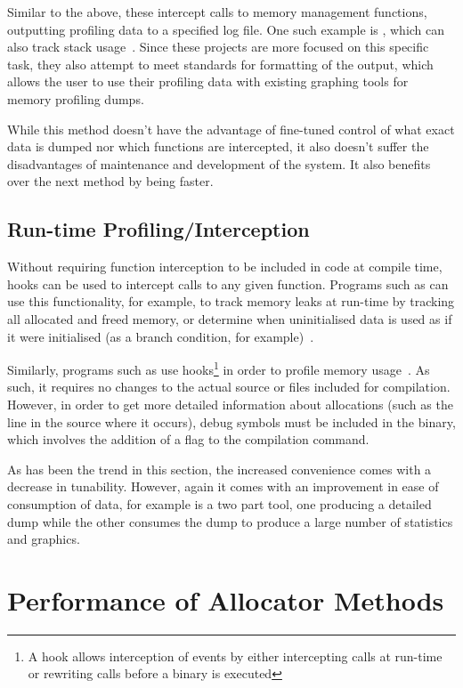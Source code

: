 Similar to the above, these intercept calls to memory management functions, outputting profiling data to a specified log file. One such example is , which can also track stack usage~\cite{malloccount}. Since these projects are more focused on this specific task, they also attempt to meet standards for formatting of the output, which allows the user to use their profiling data with existing graphing tools for memory profiling dumps.

While this method doesn't have the advantage of fine-tuned control of what exact data is dumped nor which functions are intercepted, it also doesn't suffer the disadvantages of maintenance and development of the system. It also benefits over the next method by being faster.

\subsection{Run-time Profiling/Interception}

Without requiring function interception to be included in code at compile time, hooks can be used to intercept calls to any given function. Programs such as  can use this functionality, for example, to track memory leaks at run-time by tracking all allocated and freed memory, or determine when uninitialised data is used as if it were initialised (as a branch condition, for example)~\cite{valgrind}.

Similarly, programs such as  use hooks\footnote{A hook allows interception of events by either intercepting calls at run-time or rewriting calls before a binary is executed} in order to profile memory usage~\cite{heaptrack}. As such, it requires no changes to the actual source or files included for compilation. However, in order to get more detailed information about allocations (such as the line in the source where it occurs), debug symbols must be included in the binary, which involves the addition of a flag to the compilation command.

As has been the trend in this section, the increased convenience comes with a decrease in tunability. However, again it comes with an improvement in ease of consumption of data, for example  is a two part tool, one producing a detailed dump while the other consumes the dump to produce a large number of statistics and graphics.

\section{Performance of Allocator Methods}

